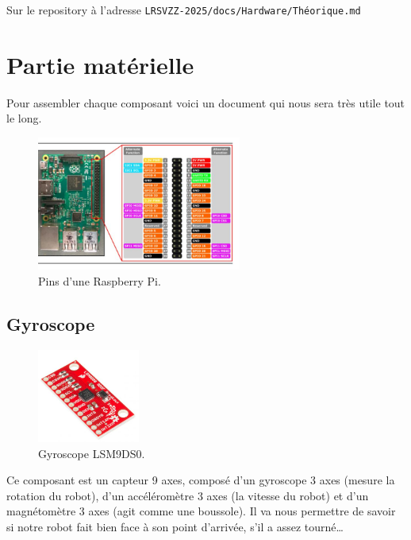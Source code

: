 \documentclass[a4paper,12pt]{report}  %
\begin{document}
Sur le repository à l'adresse \texttt{LRSVZZ-2025/docs/Hardware/Théorique.md}

\pagebreak

\section{Partie matérielle}

Pour assembler chaque composant voici un document qui nous sera très utile tout le long. 

\begin{figure}[H]
	\centering
	\includegraphics[width=0.6\textwidth]{./attachments/raspberry_pi_pin_map.jpg}
	\caption{Pins d'une Raspberry Pi. }

\end{figure}

\subsection{Gyroscope}

\begin{figure}[H]
	\centering
	\includegraphics[width=0.3\textwidth]{./attachments/gyroscope.jpg}
	\caption{Gyroscope LSM9DS0.}

\end{figure}

Ce composant est un capteur 9 axes, 
composé d’un gyroscope 3 axes (mesure la rotation du robot), 
d’un accéléromètre 3 axes (la vitesse du robot) 
et d’un magnétomètre 3 axes (agit comme une boussole). 
Il va nous permettre de savoir si notre robot fait 
bien face à son point d'arrivée, s’il a assez tourné… 
\end{document}
